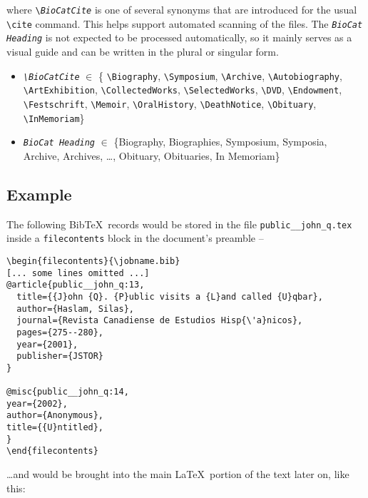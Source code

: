 \documentclass[letterpaper]{article}
\begin{document}
where {\tt \textbackslash \emph{BioCatCite}} is one of several
synonyms that are introduced for the usual \verb|\cite| command.  This
helps support automated scanning of the files.  The {\tt \emph{BioCat
    Heading}} is not expected to be processed automatically, so it
mainly serves as a visual guide and can be written in the plural or
singular form.

\bigskip

\begin{mdframed}
\begin{addmargin}[0em]{6em}
\begin{itemize}
\item {\tt \emph{\textbackslash BioCatCite}} $\in$ 
\{
\verb|\Biography|,
\verb|\Symposium|,
\verb|\Archive|,
\verb|\Autobiography|,
\verb|\ArtExhibition|,
\verb|\CollectedWorks|,
\verb|\SelectedWorks|,
\verb|\DVD|,
\verb|\Endowment|,
\verb|\Festschrift|,
\verb|\Memoir|,
\verb|\OralHistory|,
\verb|\DeathNotice|,
\verb|\Obituary|,
\verb|\InMemoriam|\}
\item {\tt \emph{BioCat Heading}} $\in$ \{Biography, Biographies,
Symposium, Symposia,
Archive, Archives,
\ldots ,
Obituary, Obituaries,
In Memoriam\} 
\end{itemize}
\end{addmargin}
\end{mdframed}

\bigskip

\subsection*{Example}

The following Bib\TeX\ records would be stored in the file
\verb|public__john_q.tex| inside a \verb|filecontents| block
in the document's preamble --

\begin{verbatim}
\begin{filecontents}{\jobname.bib}
[... some lines omitted ...]
@article{public__john_q:13,
  title={{J}ohn {Q}. {P}ublic visits a {L}and called {U}qbar},
  author={Haslam, Silas},
  journal={Revista Canadiense de Estudios Hisp{\'a}nicos},
  pages={275--280},
  year={2001},
  publisher={JSTOR}
}

@misc{public__john_q:14,
year={2002},
author={Anonymous},
title={{U}ntitled},
}
\end{filecontents}
\end{verbatim}

\ldots and would be brought into the main \LaTeX\ portion of the text
later on, like this:
\end{document}
